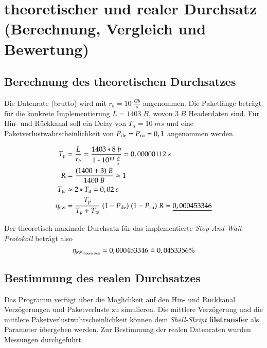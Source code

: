 \documentclass{scrartcl}
\begin{document}
\section{theoretischer und realer Durchsatz (Berechnung, Vergleich und Bewertung)}
\subsection{Berechnung des theoretischen Durchsatzes}
Die Datenrate (brutto) wird mit $r_b = 10 \; \frac{Gb}{s}$ angenommen. Die Paketlänge beträgt für die konkrete Implementierung $L = 1403\;B$, wovon $3\;B$ Headerdaten sind. Für Hin- und Rückkanal soll ein Delay von $T_a = 10\;ms$ und eine Paketverlustwahrscheinlichkeit von $P\textsubscript{de} = P\textsubscript{ru} = 0,1$ angenommen werden.

\begin{align*}
T_p &= \frac{L}{r_b} = \frac{1403 * 8 \; b}{1*10\textsuperscript{10} \; \frac{b}{s}} = 0,00000112\;s\\
R &= \frac{(1400 + 3) \; B}{1400 \; B} \approx 1\\
T_w &\approx 2 * T_a = 0,02 \; s\\
\eta\textsubscript{sw} &= \frac{T_p}{T_p + T_w} \; (1 - P\textsubscript{de}) \; (1 - P\textsubscript{ru}) \; R =  \underline{0,000453346}\\
\end{align*}

Der theoretisch maximale Durchsatz für das implementierte \textit{Stop-And-Wait-Protokoll} beträgt also $$\eta\textsubscript{sw\textsubscript{theoretisch}} = 0,000453346\; \hat{=}\; 0,0453356\%$$

\subsection{Bestimmung des realen Durchsatzes}
Das Programm verfügt über die Möglichkeit auf den Hin- und Rückkanal Verzögerungen und Paketverluste zu simulieren. Die mittlere Verzögerung und die mittlere Paketverlustwahrscheinlichkeit können dem \textit{Shell-Skript} \textbf{filetransfer} als Parameter übergeben werden. Zur Bestimmung der realen Datenraten wurden Messungen durchgeführt.\\
\end{document}

